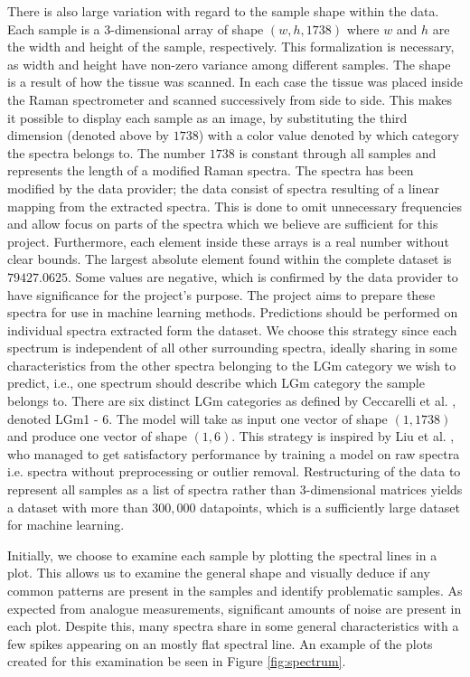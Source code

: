 There is also large variation with regard to the sample shape within the data. Each sample is a 3-dimensional array of shape $(w, h, 1738)$ where $w$ and $h$ are the width and height of the sample, respectively. This formalization is necessary, as width and height have non-zero variance among different samples. The shape is a result of how the tissue was scanned. In each case the tissue was placed inside the Raman spectrometer and scanned successively from side to side. This makes it possible to display each sample as an image, by substituting the third dimension (denoted above by $1738$) with a color value denoted by which category the spectra belongs to. The number $1738$ is constant through all samples and represents the length of a modified Raman spectra. The spectra has been modified by the data provider; the data consist of spectra resulting of a linear mapping from the extracted spectra. This is done to omit unnecessary frequencies and allow focus on parts of the spectra which we believe are sufficient for this project. Furthermore, each element inside these arrays is a real number without clear bounds. The largest absolute element found within the complete dataset is $79427.0625$. Some values are negative, which is confirmed by the data provider to have significance for the project's purpose. The project aims to prepare these spectra for use in machine learning methods. Predictions should be performed on individual spectra extracted form the dataset. We choose this strategy since each spectrum is independent of all other surrounding spectra, ideally sharing in some characteristics from the other spectra belonging to the LGm category we wish to predict, i.e., one spectrum should describe which LGm category the sample belongs to. There are six distinct LGm categories as defined by Ceccarelli et al. \cite{cellsubsets}, denoted LGm1 - 6. The model will take as input one vector of shape $(1, 1738)$ and produce one vector of shape $(1, 6)$. This strategy is inspired by Liu et al. \cite{liu2017deep}, who managed to get satisfactory performance by training a model on raw spectra i.e. spectra without preprocessing or outlier removal. Restructuring of the data to represent all samples as a list of spectra rather than 3-dimensional matrices yields a dataset with more than $300,000$ datapoints, which is a sufficiently large dataset for machine learning.

Initially, we choose to examine each sample by plotting the spectral lines in a plot. This allows us to examine the general shape and visually deduce if any common patterns are present in the samples and identify problematic samples. As expected from analogue measurements, significant amounts of noise are present in each plot. Despite this, many spectra share in some general characteristics with a few spikes appearing on an mostly flat spectral line. An example of the plots created for this examination be seen in Figure \ref{fig:spectrum}.

